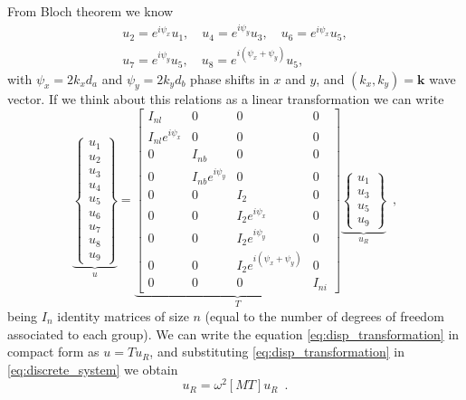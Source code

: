 From Bloch theorem we know
\begin{align*}
u_2 = e^{i \psi_x}u_1, \quad u_4 = e^{i \psi_y}u_3,\quad u_6 = e^{i \psi_x}u_5, \\
u_7 = e^{i \psi_y}u_5,\quad u_8 = e^{i (\psi_x + \psi_y)}u_5,
\end{align*}
with $\psi_x = 2 k_x d_a $ and $\psi_y = 2 k_y d_b $ phase shifts in $x$ and $y$, and $(k_x,k_y)=\mathbf{k}$ wave vector. If we think about this relations as a linear transformation we can write
\begin{equation}
\underbrace{\left\lbrace  \begin{array}{c}
u_1 \\ 
u_2 \\ 
u_3 \\ 
u_4 \\ 
u_5 \\ 
u_6 \\ 
u_7 \\ 
u_8 \\ 
u_9
\end{array}  \right\rbrace }_{u} = 
\underbrace{\left[ \begin{array}{cccc}
I_{nl} & 0 & 0 & 0 \\ 
I_{nl} e^{i\psi_x} & 0 & 0 & 0 \\ 
0 & I_{nb} & 0 & 0 \\ 
0 & I_{nb} e^{i\psi_y} & 0 & 0 \\ 
0 & 0 & I_2 & 0 \\ 
0 & 0 & I_2 e^{i\psi_x} & 0 \\ 
0 & 0 & I_2 e^{i\psi_y} & 0 \\ 
0 & 0 & I_2 e^{i(\psi_x + \psi_y)} & 0 \\ 
0 & 0 & 0 & I_{ni}
\end{array} \right] }_{T}
\underbrace{\left\lbrace \begin{array}{c}
u_1 \\ 
u_3 \\ 
u_5 \\ 
u_9
\end{array} 
\right\rbrace }_{u_R} \enspace ,
\label{eq:disp_transformation}
\end{equation}
being $I_{n}$ identity matrices of size $n$ (equal to the number of degrees of freedom associated to each group). We can write the equation \eqref{eq:disp_transformation} in compact form as $u = Tu_R$, and substituting \eqref{eq:disp_transformation} in \eqref{eq:discrete_system} we obtain
\begin{equation}
[KT]{u_R} = \omega^2[MT]{u_R} \enspace .
\label{eq:aux_system}
\end{equation}
